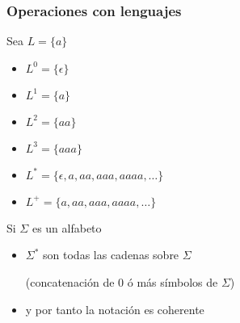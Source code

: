 \begin{frame}
  \frametitle{Operaciones con lenguajes}
      \begin{block}{Sea $L=\{ a \}$}
           \begin{itemize}[<+->]
           \item $L^0 = \{ \epsilon \} $ 
           \item $L^1 = \{ a \} $ 
           \item $L^2 = \{ aa \} $ 
           \item $L^3 = \{ aaa \} $ 
           \item $L^* = \{ \epsilon, a, aa, aaa, aaaa, \ldots \} $ 
           \item $L^+ = \{ a, aa, aaa, aaaa, \ldots \} $ 
           \end{itemize}
			\end{block}

      \pause
      \begin{block}{Si $\Sigma$ es un alfabeto}
           \begin{itemize}[<+->]
           \item $\Sigma^*$ son todas las cadenas sobre $\Sigma$ 
					 
					       (concatenación de 0 ó más símbolos de $\Sigma$)
           \item y por tanto la notación es coherente
           \end{itemize}
			\end{block}
\end{frame}
